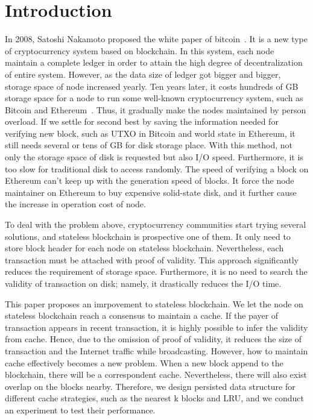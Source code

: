 \documentclass[conference]{IEEEtran}
\begin{document}
\section{Introduction}
In 2008, Satoshi Nakamoto proposed the white paper of bitcoin~\cite{b3}. It is a new type of cryptocurrency system based on blockchain. In this system, each node maintain a complete ledger in order to attain the high degree of decentralization of entire system. However, as the data size of ledger got bigger and bigger, storage space of node increased yearly. Ten years later, it costs hundreds of GB storage space for a node to run some well-known cryptocurrency system, such as Bitcoin and Ethereum~\cite{b4}. Thus, it gradually make the nodes maintained by person overload. If we settle for second best by saving the information needed for verifying new block, such as UTXO in Bitcoin and world state in Ethereum, it still needs several or tens of GB for disk storage place. With this method, not only the storage space of disk is requested but also  I/O speed. Furthermore, it is too slow for traditional disk to access randomly. The speed of verifying a block on Ethereum can't keep up with the generation speed of blocks. It force the node maintainer on Ethereum to buy expensive solid-state disk, and it further cause the increase in operation cost of node.

To deal with the problem above, cryptocurrency communities start trying several solutions, and stateless blockchain is prospective one of them. It only need to store block header for each node on stateless blockchain. Nevertheless, each transaction must be attached with proof of validity. This approach significantly reduces the requirement of storage space. Furthermore, it is no need to search the validity of transaction on disk; namely, it drastically reduces the I/O time.

This paper proposes an imrpovement to stateless blockchain. We let the node on stateless blockchain reach a consensus to maintain a cache. If the payer of transaction appears in recent transaction, it is highly possible to infer the validity from cache. Hence, due to the omission of proof of validity, it reduces the size of transaction and the Internet traffic while broadcasting. However, how to maintain cache effectively becomes a new problem. When a new block append to the blockchain, there will be a correspondent cache. Nevertheless, there will also exist overlap on the blocks nearby. Therefore, we design persisted data structure for different cache strategies, such as the nearest k blocks and LRU, and we conduct an experiment to test their performance.
\end{document}
